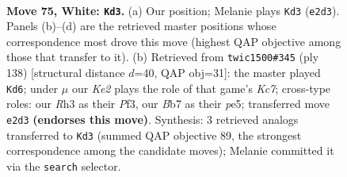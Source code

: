 \documentclass[11pt]{article}
\begin{document}
\clearpage

\begin{figure}[p]\centering
\begin{subfigure}{0.46\textwidth}\centering
\resizebox{\linewidth}{!}{%
\newchessgame
\chessboard[
  setfen={3B4/rB6/3p2kp/4p1b1/n3P2p/5P1R/4K3/8 w - - 19 75},
  showmover=false,
  pgfstyle=straightmove, color=movearrow, markmove={e2-d3}
]}
\caption{}
\end{subfigure}\hfill
\begin{subfigure}{0.46\textwidth}\centering
\resizebox{\linewidth}{!}{%
\newchessgame
\chessboard[
  setfen={4Brk1/2K3p1/4Rb1p/4p2P/6P1/5P2/8/8 w - - 17 70},
  showmover=false,
  pgfstyle=straightmove, color=movearrow, markmove={c7-d6}
]}
\caption{}
\end{subfigure}
\\[4pt]

\caption{\textbf{Move 75, White: \texttt{Kd3}.} (a) Our position; Melanie plays \texttt{Kd3} (\texttt{e2d3}). Panels (b)--(d) are the retrieved master positions whose correspondence most drove this move (highest QAP objective among those that transfer to it). (b) Retrieved from \texttt{twic1500\#345} (ply 138) [structural distance $d$=40, QAP obj=31]: the master played \texttt{Kd6}; under $\mu$ our \emph{Ke2} plays the role of that game's \emph{Kc7}; cross-type roles: our \emph{R}h3 as their \emph{P}f3, our \emph{B}b7 as their \emph{p}e5; transferred move \texttt{e2d3} \textbf{(endorses this move)}. Synthesis: 3 retrieved analogs transferred to \texttt{Kd3} (summed QAP objective 89, the strongest correspondence among the candidate moves); Melanie committed it via the \texttt{search} selector.}
\label{fig:thought-m148}
\end{figure}

\clearpage
\end{document}
